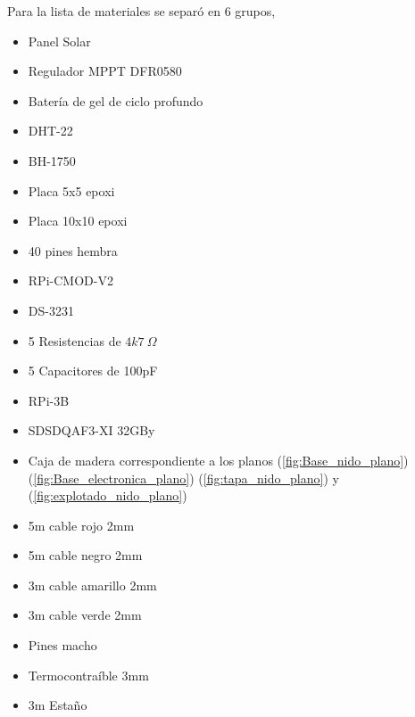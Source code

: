 Para la lista de materiales se separó en 6 grupos, 
\begin{itemize}

\item Panel Solar \TBD
\item Regulador MPPT DFR0580
\item Bater\'ia de gel de ciclo profundo \TBD
\end{itemize}
\begin{itemize}
\item DHT-22 
\item BH-1750
\item Placa 5x5 epoxi
\item Placa 10x10 epoxi
\item 40 pines hembra
\item RPi-CMOD-V2
\item DS-3231
\item 5 Resistencias de $4k7 \ \Omega$ 
\item 5 Capacitores de 100pF
\end{itemize}
\begin{itemize}
\item RPi-3B
\item SDSDQAF3-XI 32GBy
\end{itemize}


\begin{itemize}

\item Caja de madera correspondiente a los planos (\ref{fig:Base_nido_plano}) (\ref{fig:Base_electronica_plano}) (\ref{fig:tapa_nido_plano}) y (\ref{fig:explotado_nido_plano})


\end{itemize}
\begin{itemize}
\item 5m cable rojo 2mm
\item 5m cable negro 2mm
\item 3m cable amarillo 2mm
\item 3m cable verde 2mm
\item Pines macho
\item Termocontra\'ible 3mm
\item 3m Estaño

\end{itemize}









